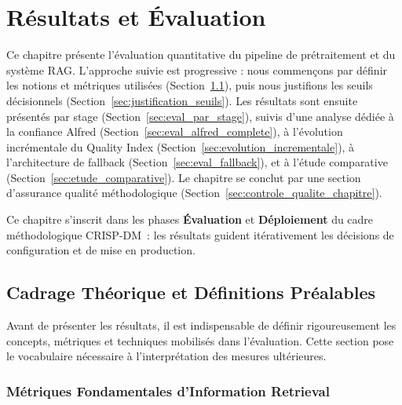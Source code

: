 
\chapter{Résultats et Évaluation}
\label{chap:resultats_evaluation}

Ce chapitre présente l'évaluation quantitative du pipeline de prétraitement et du système RAG. L'approche suivie est progressive : nous commençons par définir les notions et métriques utilisées (Section~\ref{sec:cadrage_theorique}), puis nous justifions les seuils décisionnels (Section~\ref{sec:justification_seuils}). Les résultats sont ensuite présentés par stage (Section~\ref{sec:eval_par_stage}), suivis d'une analyse dédiée à la confiance Alfred (Section~\ref{sec:eval_alfred_complete}), à l'évolution incrémentale du Quality Index (Section~\ref{sec:evolution_incrementale}), à l'architecture de fallback (Section~\ref{sec:eval_fallback}), et à l'étude comparative (Section~\ref{sec:etude_comparative}). Le chapitre se conclut par une section d'assurance qualité méthodologique (Section~\ref{sec:controle_qualite_chapitre}).

Ce chapitre s'inscrit dans les phases \textbf{Évaluation} et \textbf{Déploiement} du cadre méthodologique CRISP-DM~: les résultats guident itérativement les décisions de configuration et de mise en production.

\section{Cadrage Théorique et Définitions Préalables}
\label{sec:cadrage_theorique}

Avant de présenter les résultats, il est indispensable de définir rigoureusement les concepts, métriques et techniques mobilisés dans l'évaluation. Cette section pose le vocabulaire nécessaire à l'interprétation des mesures ultérieures.

\subsection{Métriques Fondamentales d'Information Retrieval}
\label{sec:def_ir_metrics}

